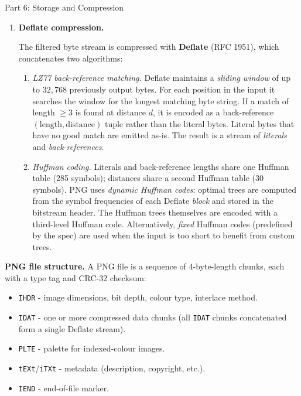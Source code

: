 \documentclass[letterpaper]{article}
\begin{document}
\begin{notes}{Part 6: Storage and Compression}
\begin{enumerate}
\begin{enumerate}
        \item \textbf{Filter selection.} The PNG spec allows the encoder to choose the filter type per row freely. A common heuristic is to pick the filter that minimises the \emph{sum of absolute values} of the residuals for that row - a proxy for entropy. More sophisticated encoders evaluate all five options and use the one that produces the smallest compressed output (rate-optimal selection).
        
    \end{enumerate}
    
    \item \textbf{Deflate compression.}

    The filtered byte stream is compressed with \textbf{Deflate} (RFC 1951), which concatenates two algorithms:

    \begin{enumerate}
        \item \textit{LZ77 back-reference matching.} Deflate maintains a \emph{sliding window} of up to $32{,}768$ previously output bytes. For each position in the input it searches the window for the longest matching byte string. If a match of length $\ge 3$ is found at distance $d$, it is encoded as a back-reference $(\text{length}, \text{distance})$ tuple rather than the literal bytes. Literal bytes that have no good match are emitted as-is. The result is a stream of \emph{literals} and \emph{back-references}.

        \item \textit{Huffman coding.} Literals and back-reference lengths share one Huffman table (285 symbols); distances share a second Huffman table (30 symbols). PNG uses \emph{dynamic Huffman codes}: optimal trees are computed from the symbol frequencies of each Deflate \emph{block} and stored in the bitstream header. The Huffman trees themselves are encoded with a third-level Huffman code. Alternatively, \emph{fixed} Huffman codes (predefined by the spec) are used when the input is too short to benefit from custom trees.
    \end{enumerate}
\end{enumerate}





\textbf{PNG file structure.} A PNG file is a sequence of 4-byte-length chunks, each with a type tag and CRC-32 checksum:
\begin{itemize}
    \item \texttt{IHDR} - image dimensions, bit depth, colour type, interlace method.
    \item \texttt{IDAT} - one or more compressed data chunks (all \texttt{IDAT} chunks concatenated form a single Deflate stream).
    \item \texttt{PLTE} - palette for indexed-colour images.
    \item \texttt{tEXt}/\texttt{iTXt} - metadata (description, copyright, etc.).
    \item \texttt{IEND} - end-of-file marker.
\end{itemize}


\end{notes}
\end{document}
